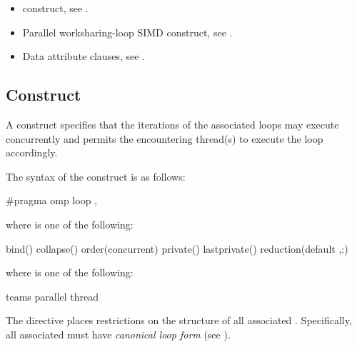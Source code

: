 \crossreferences
\begin{itemize}
\item {} construct, see
.

\item Parallel worksharing-loop SIMD construct, see
.

\item Data attribute clauses, see .
\end{itemize}



\subsection{ Construct}
\label{subsec:loop Construct}
\summary
A  construct specifies that the iterations of the associated
loops may execute concurrently and permits the encountering thread(s) to
execute the loop accordingly.

\begin{samepage}
\syntax
\begin{ccppspecific}
The syntax of the  construct is as follows:
\begin{ompcPragma}
#pragma omp loop \plc{[clause[ [},\plc{] clause] ... ] new-line}
\end{ompcPragma}

where  is one of the following:

\begin{indentedcodelist}
bind()
collapse()
order(concurrent)
private()
lastprivate()
reduction(\plc{[}default ,\plc{]reduction-identifier }:)
\end{indentedcodelist}

where  is one of the following:
\begin{indentedcodelist}
  teams
  parallel
  thread
\end{indentedcodelist}

The  directive places restrictions on the structure of all associated 
. Specifically, all associated  must have 
\emph{canonical loop form} (see ).
\end{ccppspecific}
\end{samepage}

